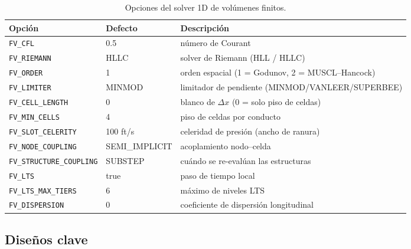 \documentclass[11pt,a4paper]{article}
\begin{document}
\begin{table}[H]
\centering
\small
\begin{tabular}{>{\raggedright}p{4.6cm}>{\raggedright}p{2.6cm}>{\raggedright\arraybackslash}p{7.2cm}}
\toprule
\textbf{Opción} & \textbf{Defecto} & \textbf{Descripción} \\
\midrule
\texttt{FV\_CFL} & 0.5 & número de Courant \\
\texttt{FV\_RIEMANN} & HLLC & solver de Riemann (HLL / HLLC) \\
\texttt{FV\_ORDER} & 1 & orden espacial (1 = Godunov, 2 = MUSCL--Hancock) \\
\texttt{FV\_LIMITER} & MINMOD & limitador de pendiente (MINMOD/VANLEER/SUPERBEE) \\
\texttt{FV\_CELL\_LENGTH} & 0 & blanco de $\Delta x$ (0 = solo piso de celdas) \\
\texttt{FV\_MIN\_CELLS} & 4 & piso de celdas por conducto \\
\texttt{FV\_SLOT\_CELERITY} & 100 ft/s & celeridad de presión (ancho de ranura) \\
\texttt{FV\_NODE\_COUPLING} & SEMI\_IMPLICIT & acoplamiento nodo--celda \\
\texttt{FV\_STRUCTURE\_COUPLING} & SUBSTEP & cuándo se re-evalúan las estructuras \\
\texttt{FV\_LTS} & true & paso de tiempo local \\
\texttt{FV\_LTS\_MAX\_TIERS} & 6 & máximo de niveles LTS \\
\texttt{FV\_DISPERSION} & 0 & coeficiente de dispersión longitudinal \\
\bottomrule
\end{tabular}
\caption{Opciones del solver 1D de volúmenes finitos.}
\label{tab:fv}
\end{table}

\subsection{Diseños clave}
\end{document}
